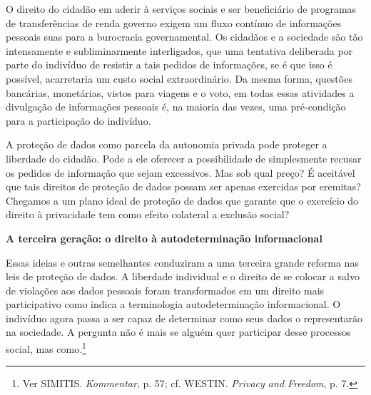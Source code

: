 O direito do cidadão em aderir à serviços sociais e ser beneficiário de
programas de transferências de renda governo exigem um fluxo contínuo de
informações pessoais suas para a burocracia governamental. Os cidadãos e
a sociedade são tão intensamente e subliminarmente interligados, que uma
tentativa deliberada por parte do indivíduo de resistir a tais pedidos
de informações, se é que isso é possível, acarretaria um custo social
extraordinário. Da mesma forma, questões bancárias, monetárias, vistos
para viagens e o voto, em todas essas atividades a divulgação de
informações pessoais é, na maioria das vezes, uma pré-condição para a
participação do indivíduo.

A proteção de dados como parcela da autonomia privada pode proteger a
liberdade do cidadão. Pode a ele oferecer a possibilidade de
simplesmente recusar os pedidos de informação que sejam excessivos. Mas
sob qual preço? É aceitável que tais direitos de proteção de dados
possam ser apenas exercidas por eremitas? Chegamos a um plano ideal de
proteção de dados que garante que o exercício do direito à privacidade
tem como efeito colateral a exclusão social?

\textbf{A terceira geração: o direito à autodeterminação informacional}

Essas ideias e outras semelhantes conduziram a uma terceira grande
reforma nas leis de proteção de dados. A liberdade individual e o
direito de se colocar a salvo de violações aos dados pessoais foram
transformados em um direito mais participativo como indica a
terminologia autodeterminação informacional. O indivíduo agora passa a
ser capaz de determinar como seus dados o representarão na sociedade. A
pergunta não é mais se alguém quer participar desse processos social,
mas como.\footnote{Ver SIMITIS. \emph{Kommentar}, p. 57; cf. WESTIN.
  \emph{Privacy and Freedom}, p. 7.}

